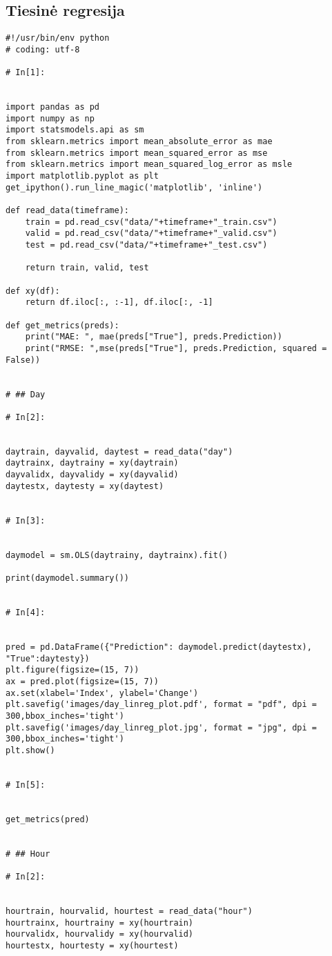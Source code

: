 \documentclass[12pt,a4paper]{article}
\begin{document}
\subsection{Tiesinė regresija}
\begin{lstlisting}[breaklines]
#!/usr/bin/env python
# coding: utf-8

# In[1]:


import pandas as pd
import numpy as np
import statsmodels.api as sm
from sklearn.metrics import mean_absolute_error as mae
from sklearn.metrics import mean_squared_error as mse
from sklearn.metrics import mean_squared_log_error as msle
import matplotlib.pyplot as plt
get_ipython().run_line_magic('matplotlib', 'inline')

def read_data(timeframe):
    train = pd.read_csv("data/"+timeframe+"_train.csv")
    valid = pd.read_csv("data/"+timeframe+"_valid.csv")
    test = pd.read_csv("data/"+timeframe+"_test.csv")
    
    return train, valid, test

def xy(df):
    return df.iloc[:, :-1], df.iloc[:, -1]

def get_metrics(preds):
    print("MAE: ", mae(preds["True"], preds.Prediction))
    print("RMSE: ",mse(preds["True"], preds.Prediction, squared = False))


# ## Day

# In[2]:


daytrain, dayvalid, daytest = read_data("day")
daytrainx, daytrainy = xy(daytrain)
dayvalidx, dayvalidy = xy(dayvalid)
daytestx, daytesty = xy(daytest)


# In[3]:


daymodel = sm.OLS(daytrainy, daytrainx).fit()

print(daymodel.summary())


# In[4]:


pred = pd.DataFrame({"Prediction": daymodel.predict(daytestx), "True":daytesty})
plt.figure(figsize=(15, 7))
ax = pred.plot(figsize=(15, 7))
ax.set(xlabel='Index', ylabel='Change')
plt.savefig('images/day_linreg_plot.pdf', format = "pdf", dpi = 300,bbox_inches='tight')
plt.savefig('images/day_linreg_plot.jpg', format = "jpg", dpi = 300,bbox_inches='tight')
plt.show()


# In[5]:


get_metrics(pred)


# ## Hour

# In[2]:


hourtrain, hourvalid, hourtest = read_data("hour")
hourtrainx, hourtrainy = xy(hourtrain)
hourvalidx, hourvalidy = xy(hourvalid)
hourtestx, hourtesty = xy(hourtest)



\end{lstlisting}
\end{document}
